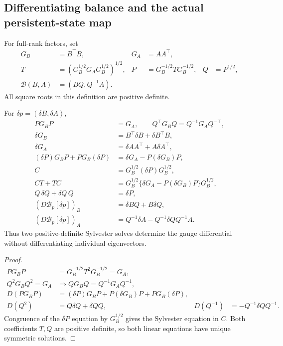 \subsection{Differentiating balance and the actual persistent-state map}
\label{app:rigid-state}
\begin{definition}
For full-rank factors, set
\begin{align}
G_B&=B^\top B,&G_A&=AA^\top,\\
T&=(G_B^{1/2}G_AG_B^{1/2})^{1/2},&
P&=G_B^{-1/2}TG_B^{-1/2},&
Q&=P^{1/2},\\
\mathcal B(B,A)&=(BQ,Q^{-1}A).
\label{eq:rigid-spd-balance}
\end{align}
All square roots in this definition are positive definite.
\end{definition}

\begin{proposition}
For $\delta p=(\delta B,\delta A)$,
\begin{align}
PG_BP&=G_A,\qquad Q^\top G_BQ=Q^{-1}G_AQ^{-\top},\\
\delta G_B&=B^\top\delta B+\delta B^\top B,\\
\delta G_A&=\delta A A^\top+A\delta A^\top,\\
(\delta P)G_BP+PG_B(\delta P)
&=\delta G_A-P(\delta G_B)P,\\
C&=G_B^{1/2}(\delta P)G_B^{1/2},\\
CT+TC&=G_B^{1/2}\{\delta G_A-P(\delta G_B)P\}G_B^{1/2},\\
Q\,\delta Q+\delta Q\,Q&=\delta P,\\
(D\mathcal B_p[\delta p])_B&=\delta BQ+B\delta Q,\\
(D\mathcal B_p[\delta p])_A&=Q^{-1}\delta A-Q^{-1}\delta Q Q^{-1}A .
\label{eq:rigid-balance-differential}
\end{align}
Thus two positive-definite Sylvester solves determine the gauge
differential without differentiating individual eigenvectors.
\end{proposition}
\begin{proof}
\begin{align}
PG_BP
&=G_B^{-1/2}T^2G_B^{-1/2}=G_A,\\
Q^2G_BQ^2=G_A
&\Longrightarrow QG_BQ=Q^{-1}G_AQ^{-1},\\
D(PG_BP)&=(\delta P)G_BP+P(\delta G_B)P+PG_B(\delta P),\\
D(Q^2)&=Q\delta Q+\delta Q Q,&
D(Q^{-1})&=-Q^{-1}\delta Q Q^{-1}.
\end{align}
Congruence of the $\delta P$ equation by $G_B^{1/2}$ gives the
Sylvester equation in $C$. Both coefficients $T,Q$ are positive
definite, so both linear equations have unique symmetric solutions.
\end{proof}

